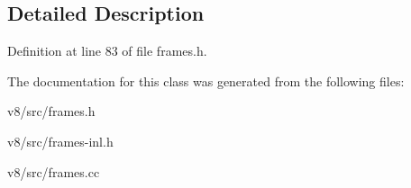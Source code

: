 \subsection{Detailed Description}


Definition at line 83 of file frames.\+h.



The documentation for this class was generated from the following files\+:\begin{DoxyCompactItemize}
\item 
v8/src/frames.\+h\item 
v8/src/frames-\/inl.\+h\item 
v8/src/frames.\+cc\end{DoxyCompactItemize}
